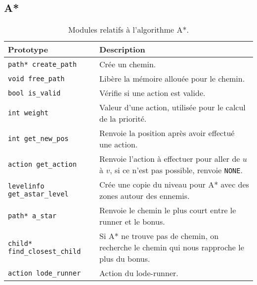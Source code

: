 \newpage

\subsection{A*}

\begin{table}[!htpb]
    \label{tab:modules-a_star}
    \begin{tabularx}{\textwidth}{lX}
        \toprule
        \textbf{Prototype} & \textbf{Description} \\
        \midrule
        \texttt{path* create\_path} & Crée un chemin. \\
        \texttt{void free\_path} & Libère la mémoire allouée pour le chemin. \\
        \texttt{bool is\_valid} & Vérifie si une action est valide. \\
        \texttt{int weight} & Valeur d'une action, utilisée pour le calcul de la priorité. \\
        \texttt{int get\_new\_pos} & Renvoie la position après avoir effectué une action. \\
        \texttt{action get\_action} & Renvoie l'action à effectuer pour aller de $u$ à $v$, si ce n'est pas possible, renvoie \texttt{NONE}. \\
        \texttt{levelinfo get\_astar\_level} & Crée une copie du niveau pour A* avec des zones autour des ennemis. \\
        \texttt{path* a\_star} & Renvoie le chemin le plus court entre le runner et le bonus. \\
        \texttt{child* find\_closest\_child} & Si A* ne trouve pas de chemin, on recherche le chemin qui nous rapproche le plus du bonus. \\
        \texttt{action lode\_runner} & Action du lode-runner. \\
        \bottomrule
    \end{tabularx}
    \caption{Modules relatifs à l'algorithme A*.}
\end{table}


